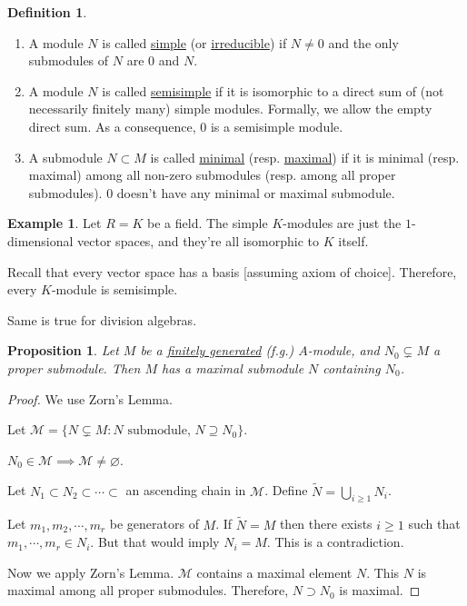\documentclass{article}
\theoremstyle{definition}
\newtheorem*{example}{Example}
\newtheorem*{definition}{Definition}
\theoremstyle{plain}
\newtheorem{proposition}[theorem]{Proposition}
\theoremstyle{remark}
\begin{document}
    \begin{definition}
        \begin{enumerate}[label=\arabic*)]
            \item A module \(N\) is called \underline{simple} (or \underline{irreducible}) if \(N\neq 0\) and the only submodules of \(N\) are \(0\) and \(N\).
            \item A module \(N\) is called \underline{semisimple} if it is isomorphic to a direct sum of (not necessarily finitely many) simple modules. Formally, we allow the empty direct sum. As a consequence, \(0\) is a semisimple module. 
            \item A submodule \(N \subset M\) is called \underline{minimal} (resp. \underline{maximal}) if it is minimal (resp. maximal) among all non-zero submodules (resp. among all proper submodules). \(0\) doesn't have any minimal or maximal submodule.
        \end{enumerate} 
    \end{definition}

    \begin{example}
        Let \(R = K\) be a field. The simple \(K\)-modules are just the \(1\)-dimensional vector spaces, and they're all isomorphic to \(K\) itself.

        Recall that every vector space has a basis [assuming axiom of choice]. Therefore, every \(K\)-module is semisimple.

        Same is true for division algebras.
    \end{example}

    \setcounter{theorem}{10}

    \begin{proposition}
        Let \(M\) be a \underline{finitely generated} (f.g.) \(A\)-module, and \(N_0 \subsetneq M\) a proper submodule. Then \(M\) has a maximal submodule \(N\) containing \(N_0\).
    \end{proposition}

    \begin{proof}
        We use Zorn's Lemma.

        Let \(\mathscr{M} = \{ N \subsetneq M : N \text{ submodule, } N \supseteq N_0 \}\).

        \(N_0 \in \mathscr{M} \implies \mathscr{M} \neq \varnothing\).

        Let \(N_1 \subset N_2 \subset \cdots \subset\) an ascending chain in \(\mathscr{M}\). Define \(\widetilde{N} = \bigcup_{i \geq 1} N_i\).

        Let \(m_1 , m_2 , \cdots , m_r\) be generators of \(M\). If \(\widetilde{N} = M\) then there exists \(i \geq 1\) such that \(m_1 , \cdots , m_r \in N_i\). But that would imply \(N_i = M\). This is a contradiction.

        Now we apply Zorn's Lemma. \(\mathscr{M}\) contains a maximal element \(N\). This \(N\) is maximal among all proper submodules. Therefore, \(N \supset N_0\) is maximal.
    \end{proof}
\end{document}
